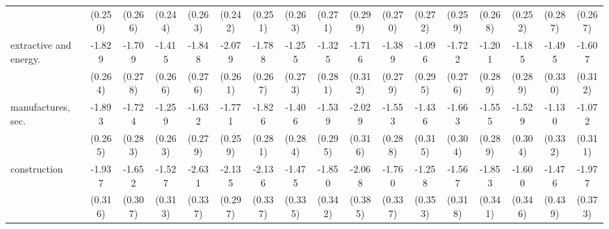 {\begin{tabular}{l*{16}{c}}
                    &     (0.250)         &     (0.266)         &     (0.244)         &     (0.263)         &     (0.242)         &     (0.251)         &     (0.263)         &     (0.271)         &     (0.299)         &     (0.270)         &     (0.272)         &     (0.259)         &     (0.268)         &     (0.252)         &     (0.287)         &     (0.267)         \\
[1em]
extractive and energy.&      -1.829\sym{***}&      -1.709\sym{***}&      -1.415\sym{***}&      -1.848\sym{***}&      -2.079\sym{***}&      -1.788\sym{***}&      -1.255\sym{***}&      -1.325\sym{***}&      -1.716\sym{***}&      -1.389\sym{***}&      -1.096\sym{***}&      -1.722\sym{***}&      -1.201\sym{***}&      -1.185\sym{***}&      -1.495\sym{***}&      -1.607\sym{***}\\
                    &     (0.264)         &     (0.278)         &     (0.266)         &     (0.276)         &     (0.261)         &     (0.267)         &     (0.273)         &     (0.281)         &     (0.312)         &     (0.279)         &     (0.295)         &     (0.276)         &     (0.289)         &     (0.289)         &     (0.330)         &     (0.312)         \\
[1em]
manufactures, sec.  &      -1.893\sym{***}&      -1.724\sym{***}&      -1.259\sym{***}&      -1.632\sym{***}&      -1.771\sym{***}&      -1.826\sym{***}&      -1.406\sym{***}&      -1.539\sym{***}&      -2.029\sym{***}&      -1.553\sym{***}&      -1.436\sym{***}&      -1.663\sym{***}&      -1.555\sym{***}&      -1.529\sym{***}&      -1.130\sym{***}&      -1.072\sym{***}\\
                    &     (0.265)         &     (0.283)         &     (0.263)         &     (0.279)         &     (0.259)         &     (0.281)         &     (0.284)         &     (0.295)         &     (0.316)         &     (0.288)         &     (0.315)         &     (0.304)         &     (0.289)         &     (0.304)         &     (0.332)         &     (0.311)         \\
[1em]
construction        &      -1.937\sym{***}&      -1.652\sym{***}&      -1.527\sym{***}&      -2.631\sym{***}&      -2.135\sym{***}&      -2.136\sym{***}&      -1.475\sym{***}&      -1.850\sym{***}&      -2.068\sym{***}&      -1.760\sym{***}&      -1.258\sym{***}&      -1.567\sym{***}&      -1.853\sym{***}&      -1.600\sym{***}&      -1.476\sym{***}&      -1.977\sym{***}\\
                    &     (0.316)         &     (0.307)         &     (0.313)         &     (0.337)         &     (0.297)         &     (0.337)         &     (0.335)         &     (0.342)         &     (0.385)         &     (0.337)         &     (0.353)         &     (0.318)         &     (0.341)         &     (0.346)         &     (0.439)         &     (0.373)         \\

\end{tabular}}
